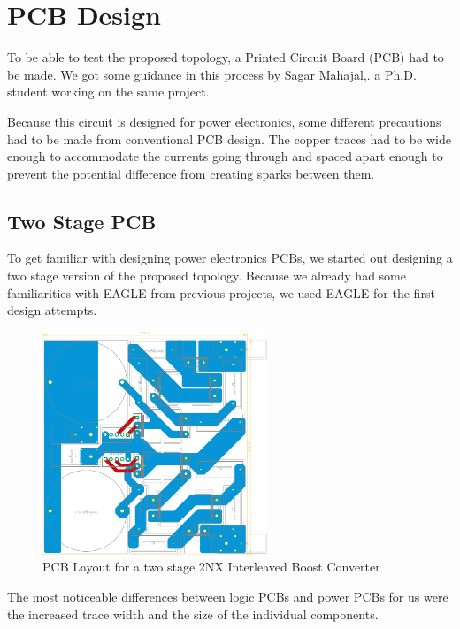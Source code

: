 \section{PCB Design}\label{ch:PCB}

To be able to test the proposed topology,
a Printed Circuit Board (PCB) had to be made.
We got some guidance in this process by Sagar Mahajal,.
a Ph.D. student working on the same project.

Because this circuit is designed for power electronics,
some different precautions had to be made from conventional PCB design.
The copper traces had to be wide enough to accommodate the currents going through
and spaced apart enough to prevent the potential difference from creating sparks between them.

\subsection{Two Stage PCB}
To get familiar with designing power electronics PCBs,
we started out designing a two stage version of the proposed topology.
Because we already had some familiarities with EAGLE from previous projects,
we used EAGLE for the first design attempts.

\begin{figure}[H]
	\begin{center}
	\includegraphics[width=0.6\textwidth]{figures/05cPCBdesign/2NX_interleaved_boost_converter_EAGLE_BY_DANIEL.pdf}
	\end{center}
	\caption{PCB Layout for a two stage 2NX Interleaved Boost Converter}
	\label{fig:2nxeagle}
\end{figure}

The most noticeable differences between logic PCBs and power PCBs for us were
the increased trace width and the size of the individual components.

